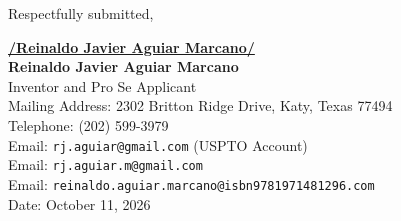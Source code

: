 \documentclass[11pt,letterpaper]{article}
\begin{document}
\vspace{0.4cm}
\begin{singlespace}
\noindent Respectfully submitted, \par\vspace{0.8cm}
\underline{\textbf{/Reinaldo Javier Aguiar Marcano/}} \\
\textbf{Reinaldo Javier Aguiar Marcano} \\
Inventor and Pro Se Applicant \\
Mailing Address: 2302 Britton Ridge Drive, Katy, Texas 77494 \\
Telephone: (202) 599-3979 \\
Email: \texttt{rj.aguiar@gmail.com} (USPTO Account) \\
Email: \texttt{rj.aguiar.m@gmail.com} \\
Email: \texttt{reinaldo.aguiar.marcano@isbn9781971481296.com} \\
Date: October 11, 2026
\end{singlespace}
\end{document}
